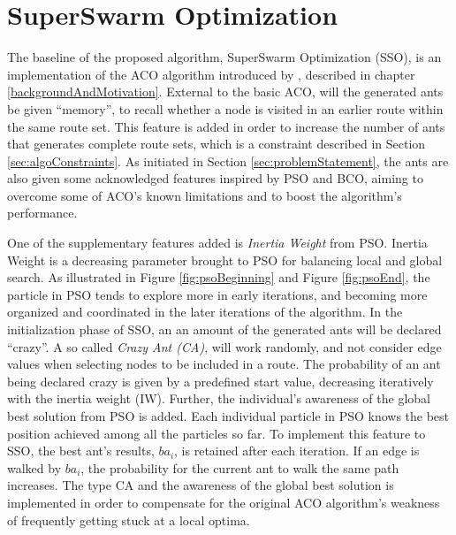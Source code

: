 \section{SuperSwarm Optimization}
\label{section:methodDescription}

The baseline of the proposed algorithm, SuperSwarm Optimization (SSO), is an implementation of the ACO algorithm introduced by \citet{nanda11}, described in chapter \vref{backgroundAndMotivation}. External to the basic ACO, will the generated ants be given ``memory'', to recall whether a node is visited in an earlier route within the same route set. This feature is added in order to increase the number of ants that generates complete route sets, which is a constraint described in Section \vref{sec:algoConstraints}. As initiated in Section \vref{sec:problemStatement}, the ants are also given some acknowledged features inspired by PSO and BCO, aiming to overcome some of ACO's known limitations and to boost the algorithm's performance. 

One of the supplementary features added is \textit{Inertia Weight} from PSO. Inertia Weight is a decreasing parameter brought to PSO for balancing local and global search. As illustrated in Figure \vref{fig:psoBeginning} and Figure \vref{fig:psoEnd}, the particle in PSO tends to explore more in early iterations, and becoming more organized and coordinated in the later iterations of the algorithm. In the initialization phase of SSO, an an amount of the generated ants will be declared ``crazy''. A so called \textit{Crazy Ant (CA)}, will work randomly, and not consider edge values when selecting nodes to be included in a route. The probability of an ant being declared crazy is given by a predefined start value, decreasing iteratively with the inertia weight (IW). %
Further, the individual's awareness of the global best solution from PSO is added. Each individual particle in PSO knows the best position achieved among all the particles so far. To implement this feature to SSO, the best ant's results, $ba_i$, is retained after each iteration. If an edge is walked by $ba_i$, the probability for the current ant to walk the same path increases. The type CA and the awareness of the global best solution is implemented in order to compensate for the original ACO algorithm's weakness of frequently getting stuck at a local optima. %

